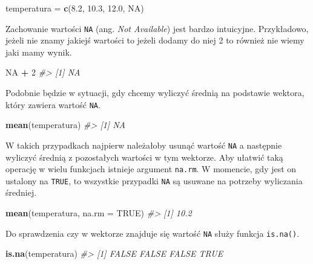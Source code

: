 \documentclass[paper=6in:9in,pagesize=pdftex,headinclude=on,footinclude=on,10pt]{scrbook}
\newenvironment{Shaded}{\begin{snugshade}}{\end{snugshade}}
\newcommand{\CommentTok}[1]{\textcolor[rgb]{0.56,0.35,0.01}{\textit{#1}}}
\newcommand{\DataTypeTok}[1]{\textcolor[rgb]{0.13,0.29,0.53}{#1}}
\newcommand{\DecValTok}[1]{\textcolor[rgb]{0.00,0.00,0.81}{#1}}
\newcommand{\FloatTok}[1]{\textcolor[rgb]{0.00,0.00,0.81}{#1}}
\newcommand{\KeywordTok}[1]{\textcolor[rgb]{0.13,0.29,0.53}{\textbf{#1}}}
\newcommand{\NormalTok}[1]{#1}
\newcommand{\OperatorTok}[1]{\textcolor[rgb]{0.81,0.36,0.00}{\textbf{#1}}}
\newcommand{\OtherTok}[1]{\textcolor[rgb]{0.56,0.35,0.01}{#1}}
\newcommand{\StringTok}[1]{\textcolor[rgb]{0.31,0.60,0.02}{#1}}
\begin{document}
\begin{Shaded}
\begin{Highlighting}[]
\NormalTok{temperatura =}\StringTok{ }\KeywordTok{c}\NormalTok{(}\FloatTok{8.2}\NormalTok{, }\FloatTok{10.3}\NormalTok{, }\FloatTok{12.0}\NormalTok{, }\OtherTok{NA}\NormalTok{)}
\end{Highlighting}
\end{Shaded}

Zachowanie wartości \texttt{NA} (ang. \emph{Not Available}) jest bardzo intuicyjne.
Przykładowo, jeżeli nie znamy jakiejś wartości to jeżeli dodamy do niej 2 to również nie wiemy jaki mamy wynik.

\begin{Shaded}
\begin{Highlighting}[]
\OtherTok{NA} \OperatorTok{+}\StringTok{ }\DecValTok{2}
\CommentTok{#> [1] NA}
\end{Highlighting}
\end{Shaded}

Podobnie będzie w sytuacji, gdy chcemy wyliczyć średnią na podstawie wektora, który zawiera wartość \texttt{NA}.

\begin{Shaded}
\begin{Highlighting}[]
\KeywordTok{mean}\NormalTok{(temperatura)}
\CommentTok{#> [1] NA}
\end{Highlighting}
\end{Shaded}

W takich przypadkach najpierw należałoby usunąć wartość \texttt{NA} a następnie wyliczyć średnią z pozostałych wartości w tym wektorze.
Aby ułatwić taką operację w wielu funkcjach istnieje argument \texttt{na.rm}.
W momencie, gdy jest on ustalony na \texttt{TRUE}, to wszystkie przypadki \texttt{NA} są usuwane na potrzeby wyliczania średniej.

\begin{Shaded}
\begin{Highlighting}[]
\KeywordTok{mean}\NormalTok{(temperatura, }\DataTypeTok{na.rm =} \OtherTok{TRUE}\NormalTok{)}
\CommentTok{#> [1] 10.2}
\end{Highlighting}
\end{Shaded}

Do sprawdzenia czy w wektorze znajduje się wartość \texttt{NA} służy funkcja \texttt{is.na()}.

\begin{Shaded}
\begin{Highlighting}[]
\KeywordTok{is.na}\NormalTok{(temperatura)}
\CommentTok{#> [1] FALSE FALSE FALSE  TRUE}
\end{Highlighting}
\end{Shaded}
\end{document}
